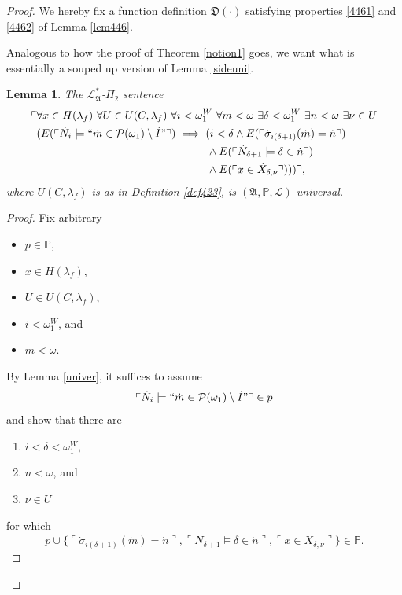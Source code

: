 \documentclass[12pt, twoside]{memoir}
\numberwithin{equation}{section}
\newtheorem{lem}[thm]{Lemma}
\theoremstyle{definition}
\theoremstyle{remark}
\theoremstyle{definition}
\theoremstyle{definition}
\theoremstyle{definition}
\theoremstyle{remark}
\begin{document}
\begin{proof}
We hereby fix a function definition $\mathfrak{D}(\cdot)$ satisfying properties \ref{4461} and \ref{4462} of Lemma \ref{lem446}.

Analogous to how the proof of Theorem \ref{notion1} goes, we want what is essentially a souped up version of Lemma \ref{sideuni}.

\begin{lem}\label{lem452}
The $\mathcal{L}^*_{\mathfrak{A}}$-$\Pi_2$ sentence 
\begin{align}\label{eq4.4}
\begin{split}
    \ulcorner & \forall x \in H(\lambda_f) \ \forall U \in U(C, \lambda_f) \ \forall i < \omega_1^W \ \forall m < \omega \ \exists \delta < \omega_1^W \ \exists n < \omega \ \exists \nu \in U \\ 
    & (E(\ulcorner \dot{N}_i \models ``\dot{m} \in \mathcal{P}(\omega_1) \setminus \dot{I}" \urcorner) \implies (i < \delta \wedge E(\ulcorner \dot{\sigma}_{i(\delta + 1)}(\dot{m}) = \dot{n} \urcorner) \\
    & \mspace{279mu} \wedge E(\ulcorner \dot{N}_{\delta + 1} \models \delta \in \dot{n} \urcorner) \\
    & \mspace{279mu} \wedge E(\ulcorner x \in \dot{X}_{\delta, \nu} \urcorner))) \urcorner \text{,}
\end{split}
\end{align}
where $U(C, \lambda_f)$ is as in Definition \ref{def423}, is $(\mathfrak{A}, \mathbb{P}, \mathcal{L})$-universal.
\end{lem}

\begin{proof}
Fix arbitrary
\begin{itemize}
    \item $p \in \mathbb{P}$,
    \item $x \in H(\lambda_f)$,
    \item $U \in U(C, \lambda_f)$,
    \item $i < \omega_1^W$, and
    \item $m < \omega$.
\end{itemize}
By Lemma \ref{univer}, it suffices to assume 
\begin{equation}\label{eq4.5}
    \ulcorner \dot{N}_i \models ``\dot{m} \in \mathcal{P}(\omega_1) \setminus \dot{I}" \urcorner \in p
\end{equation}
and show that there are 
\begin{enumerate}[label=(\Alph*)]
    \item $i < \delta < \omega_1^W$,
    \item $n < \omega$, and
    \item $\nu \in U$
\end{enumerate} 
for which 
\begin{equation*}
    p \cup \{\ulcorner \dot{\sigma}_{i(\delta + 1)}(\dot{m}) = \dot{n} \urcorner, \ulcorner \dot{N}_{\delta + 1} \models \delta \in \dot{n} \urcorner, \ulcorner x \in \dot{X}_{\delta, \nu} \urcorner\} \in \mathbb{P} \text{.}
\end{equation*}


\end{proof}
\end{proof}
\end{document}
